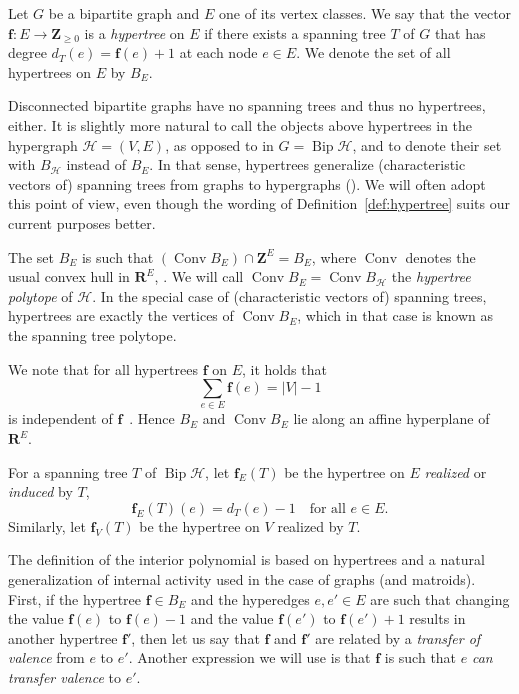 \documentclass[ALCO,ThmDefs,Unicode,epreuves]{cedram}
\newcommand{\R}{\mathbf{R}}
\newcommand{\Z}{\mathbf{Z}}
\newcommand{\HH}{\mathcal H}
\DeclareMathOperator{\bip}{Bip}
\DeclareMathOperator{\conv}{Conv}
\begin{document}
\begin{defi}
\label{def:hypertree}
Let $G$ be a bipartite graph and $E$ one of its vertex classes. We say that the vector $\mathbf f\colon E\to\Z_{\ge0}$ is a \emph{hypertree} on $E$ if there exists a spanning tree $T$ of $G$ that has degree $d_T(e)=\mathbf f(e)+1$ at each node $e\in E$. We denote the set of all hypertrees on $E$ by $B_{E}$.
\end{defi}

Disconnected bipartite graphs have no spanning trees and thus no hypertrees, either. It is slightly more natural to call the objects above hypertrees in the hypergraph $\HH=(V,E)$, as opposed to in $G=\bip\HH$, and to denote their set with $B_\HH$ instead of $B_E$. In that sense, hypertrees generalize (characteristic vectors of) spanning trees from graphs to hypergraphs (\cf \cite[Remark~3.2]{hiperTutte}). We will often adopt this point of view, even though the wording of Definition~\ref{def:hypertree} suits our current purposes better.

The set $B_E$ is such that $(\conv B_E)\cap\Z^E=B_{E}$, where $\conv$ denotes the usual convex hull in $\R^E$, \cf \cite[Lemma~3.4]{hiperTutte}. We will call $\conv B_{E}=\conv B_\HH$ the \emph{hypertree polytope} of $\HH$. In the special case of (characteristic vectors of) spanning trees, hypertrees are exactly the vertices of $\conv B_E$, which in that case is known as the spanning tree polytope.

We note that for all hypertrees $\mathbf f$ on $E$, it holds that 
\[\sum_{e\in E}\mathbf f(e)=|V|-1\]
is independent of $\mathbf f$~\cite[Theorem~3.4]{hiperTutte}. Hence $B_E$ and $\conv B_E$ lie along an affine hyperplane of $\R^E$.

For a spanning tree $T$ of $\bip \HH$, let $\mathbf f_E(T)$ be the hypertree on $E$ \emph{realized} or \emph{induced} by $T$, \ie
\[\mathbf f_E(T)(e)=d_T(e)-1 \quad \text{for all }e\in E.\]
Similarly, let $\mathbf f_V(T)$ be the hypertree on $V$ realized by $T$.

The definition of the interior polynomial is based on hypertrees and a natural generalization of internal activity used in the case of graphs (and matroids). First, if the hypertree $\mathbf{f}\in B_{E}$ and the hyperedges $e, e'\in E$ are such that changing the value $\mathbf{f}(e)$ to $\mathbf{f}(e)-1$ and the value $\mathbf{f}(e')$ to $\mathbf{f}(e')+1$ results in another hypertree $\mathbf{f'}$, then let us say that $\mathbf{f}$ and $\mathbf{f'}$ are related by a \emph{transfer of valence} from $e$ to $e'$. Another expression we will use is that $\mathbf f$ is such that $e$ \emph{can transfer valence} to $e'$.
\end{document}
